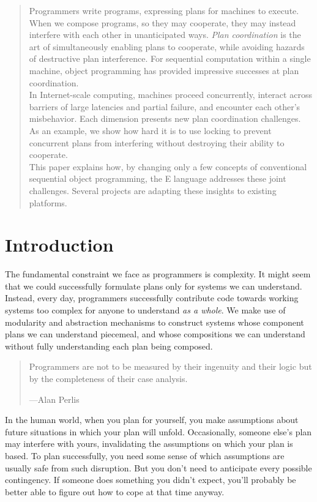 \documentclass{llncs}
\begin{document}
\begin{abstract}
Programmers write programs, expressing plans for machines to
execute. When we compose programs, so they may cooperate, they may
instead interfere with each other in unanticipated ways. \emph{Plan
coordination} is the art of simultaneously enabling plans to
cooperate, while avoiding hazards of destructive plan
interference. For sequential computation within a single machine,
object programming has provided impressive successes at plan
coordination.\\

In Internet-scale computing, machines proceed concurrently, interact
across barriers of large latencies and partial failure, and encounter
each other's misbehavior. Each dimension presents new plan
coordination challenges. As an example, we show how hard it is to use
locking to prevent concurrent plans from interfering without
destroying their ability to cooperate.\\

This paper explains how, by changing only a few concepts of
conventional sequential object programming, the E language addresses
these joint challenges. Several projects are adapting these insights
to existing platforms.
\end{abstract}

\section{Introduction}

The fundamental constraint we face as programmers is complexity. It
might seem that we could successfully formulate plans only for systems
we can understand. Instead, every day, programmers successfully
contribute code towards working systems too complex for anyone to
understand \emph{as a whole}. We make use of modularity and
abstraction mechanisms to construct systems whose component plans we
can understand piecemeal, and whose compositions we can understand
without fully understanding each plan being composed.
%
\begin{quote}
Programmers are not to be measured by their ingenuity and their logic
but by the completeness of their case analysis.
\begin{flushright}
---Alan Perlis
\end{flushright}
\end{quote}
%
In the human world, when you plan for yourself, you make assumptions
about future situations in which your plan will unfold. Occasionally,
someone else's plan may interfere with yours, invalidating the
assumptions on which your plan is based. To plan successfully, you
need some sense of which assumptions are usually safe from such
disruption. But you don't need to anticipate every possible
contingency. If someone does something you didn't expect, you'll
probably be better able to figure out how to cope at that time anyway.
\end{document}
